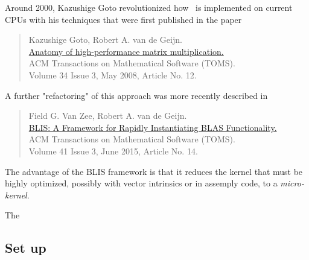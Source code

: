Around 2000, Kazushige Goto revolutionized how \Gemm\ is implemented on current CPUs with his techniques
that were first published in the paper
\begin{quote}
	Kazushige Goto, Robert A. van de Geijn.\\
	\href{http://dl.acm.org/citation.cfm?id=1356052.1356053&coll=DL&dl=GUIDE&CFID=71223967&CFTOKEN=96440140}{Anatomy of high-performance matrix multiplication.}\\
	ACM Transactions on Mathematical Software (TOMS).\\
	Volume 34 Issue 3, May 2008, Article No. 12.
\end{quote}
A further "refactoring" of this approach was more recently described in 
\begin{quote}
	Field G. Van Zee, Robert A. van de Geijn. \\
	\href{http://dl.acm.org/citation.cfm?id=2786970.2764454&coll=DL&dl=GUIDE&CFID=702354034&CFTOKEN=48470379}{%
		BLIS: A Framework for Rapidly Instantiating BLAS Functionality.} \\
	ACM Transactions on Mathematical Software (TOMS).\\
	Volume 41 Issue 3, June 2015,
	Article No. 14.
\end{quote}
The advantage of the BLIS framework is that it reduces the kernel that must be highly optimized, possibly with vector intrinsics or in assemply code, to a {\em micro-kernel}. 

The 


\subsection{Set up}

